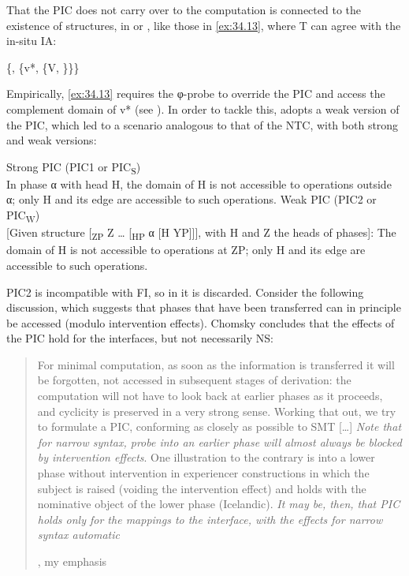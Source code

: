 \documentclass[output=paper]{langsci/langscibook}
\begin{document}
That the \gls{PIC} does not carry over to the computation is connected to the
existence of structures, in  or , like those in \eqref{ex:34.13}, where T
can agree with the in-situ \gls{IA}:

\ea\label{ex:34.13}
    \{, \{v*, \{V, \}\}\}
    \vspace{1.5\baselineskip}
\z

Empirically, \eqref{ex:34.13} requires the φ-probe to override the \gls{PIC} and access the
complement domain of v* (see \citealt{Richards2012}). In order to tackle this,
\textcite{Chomsky2001,Chomsky2004} adopts a weak version of the \gls{PIC}, which led to a
scenario analogous to that of the \gls{NTC}, with both strong and weak
versions:

\ea%
	\ea\label{ex:34.14a}Strong \gls{PIC} (PIC1 or PIC\textsubscript{S})\\
        In phase α with head H, the domain of H is not accessible to operations
        outside α; only H and its edge are accessible to such operations.
        \parencite[108]{Chomsky2000}
	\ex\label{ex:34.14b}Weak \gls{PIC} (PIC2 or PIC\textsubscript{W})\\
        {}[Given structure [\textsubscript{ZP} Z \dots{} [\textsubscript{HP} α
        [H YP]]], with H and Z the heads of phases]: The domain of H is not
        accessible to operations at ZP; only H and its edge are accessible to
        such operations. \parencite[14]{Chomsky2001}
	\z
\z

PIC2 is incompatible with \gls{FI}, so in \citet{Chomsky2008} it is discarded.
Consider the following discussion, which suggests that phases that have been
transferred can in principle be accessed (modulo intervention effects). Chomsky
concludes that the effects of the \gls{PIC} hold for the interfaces, but not
necessarily \gls{NS}:

\blockquote[{\citealt[143]{Chomsky2008}, my emphasis}][.]{For minimal
    computation, as soon as the information is transferred it will be
    forgotten, not accessed in subsequent stages of derivation: the computation
    will not have to look back at earlier phases as it proceeds, and cyclicity
    is preserved in a very strong sense. Working that out, we try to formulate
    a \gls{PIC}, conforming as closely as possible to \gls{SMT} [\dots{}] \emph{Note that for narrow syntax, probe into
an earlier phase will almost always be blocked by intervention
effects}. One illustration to the contrary is  into a lower
phase without intervention in experiencer constructions in which the
subject is raised (voiding the intervention effect) and  holds
with the nominative object of the lower phase
(Icelandic). \emph{It may be, then, that \gls{PIC} holds only for the mappings
to the interface, with the effects for narrow syntax automatic}}
\end{document}

